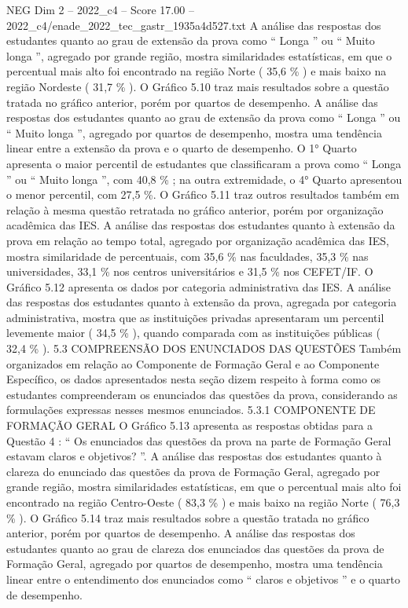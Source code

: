 \begin{textsample}{NEG Dim 2 – 2022\_c4 – Score 17.00 – 2022\_c4/enade\_2022\_tec\_gastr\_1935a4d527.txt}
A análise das respostas dos estudantes quanto ao grau de extensão da prova como “ Longa ” ou “ Muito longa ”, agregado por grande região, mostra similaridades estatísticas, em que o percentual mais alto foi encontrado na região Norte ( 35,6 \% ) e mais baixo na região Nordeste ( 31,7 \% ).
O Gráfico 5.10 traz mais resultados sobre a questão tratada no gráfico anterior, porém por quartos de desempenho.
A análise das respostas dos estudantes quanto ao grau de extensão da prova como “ Longa ” ou “ Muito longa ”, agregado por quartos de desempenho, mostra uma tendência linear entre a extensão da prova e o quarto de desempenho.
O 1{\EmojiFont °} Quarto apresenta o maior percentil de estudantes que classificaram a prova como “ Longa ” ou “ Muito longa ”, com 40,8 \% ; na outra extremidade, o 4{\EmojiFont °} Quarto apresentou o menor percentil, com 27,5 \%.
O Gráfico 5.11 traz outros resultados também em relação à mesma questão retratada no gráfico anterior, porém por organização acadêmica das IES.
A análise das respostas dos estudantes quanto à extensão da prova em relação ao tempo total, agregado por organização acadêmica das IES, mostra similaridade de percentuais, com 35,6 \% nas faculdades, 35,3 \% nas universidades, 33,1 \% nos centros universitários e 31,5 \% nos CEFET/IF.
O Gráfico 5.12 apresenta os dados por categoria administrativa das IES.
A análise das respostas dos estudantes quanto à extensão da prova, agregada por categoria administrativa, mostra que as instituições privadas apresentaram um percentil levemente maior ( 34,5 \% ), quando comparada com as instituições públicas ( 32,4 \% ). 5.3 COMPREENSÃO DOS ENUNCIADOS DAS QUESTÕES Também organizados em relação ao Componente de Formação Geral e ao Componente Específico, os dados apresentados nesta seção dizem respeito à forma como os estudantes compreenderam os enunciados das questões da prova, considerando as formulações expressas nesses mesmos enunciados. 5.3.1 COMPONENTE DE FORMAÇÃO GERAL O Gráfico 5.13 apresenta as respostas obtidas para a Questão 4 : “ Os enunciados das questões da prova na parte de Formação Geral estavam claros e objetivos? ”.
A análise das respostas dos estudantes quanto à clareza do enunciado das questões da prova de Formação Geral, agregado por grande região, mostra similaridades estatísticas, em que o percentual mais alto foi encontrado na região Centro-Oeste ( 83,3 \% ) e mais baixo na região Norte ( 76,3 \% ).
O Gráfico 5.14 traz mais resultados sobre a questão tratada no gráfico anterior, porém por quartos de desempenho.
A análise das respostas dos estudantes quanto ao grau de clareza dos enunciados das questões da prova de Formação Geral, agregado por quartos de desempenho, mostra uma tendência linear entre o entendimento dos enunciados como “ claros e objetivos ” e o quarto de desempenho.

\end{textsample}
